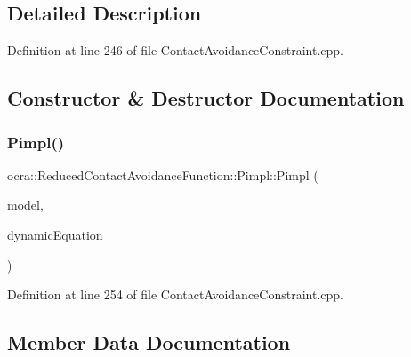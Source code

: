 \subsection{Detailed Description}


Definition at line 246 of file Contact\+Avoidance\+Constraint.\+cpp.



\subsection{Constructor \& Destructor Documentation}
\hypertarget{structReducedContactAvoidanceFunction_1_1Pimpl_ab7258766eea3fd037b4e59e381adfdd5}{}\label{structReducedContactAvoidanceFunction_1_1Pimpl_ab7258766eea3fd037b4e59e381adfdd5} 
\subsubsection{\texorpdfstring{Pimpl()}{Pimpl()}}
{\footnotesize\ttfamily ocra\+::\+Reduced\+Contact\+Avoidance\+Function\+::\+Pimpl\+::\+Pimpl (\begin{DoxyParamCaption}\item[{const Model \&}]{model,  }\item[{const \hyperlink{classocra_1_1FullDynamicEquationFunction}{Full\+Dynamic\+Equation\+Function} \&}]{dynamic\+Equation }\end{DoxyParamCaption})\hspace{0.3cm}{\ttfamily [inline]}}



Definition at line 254 of file Contact\+Avoidance\+Constraint.\+cpp.



\subsection{Member Data Documentation}
\hypertarget{structReducedContactAvoidanceFunction_1_1Pimpl_a2993139449f5c29b4a85a9e3c261834c}{}\label{structReducedContactAvoidanceFunction_1_1Pimpl_a2993139449f5c29b4a85a9e3c261834c} 

